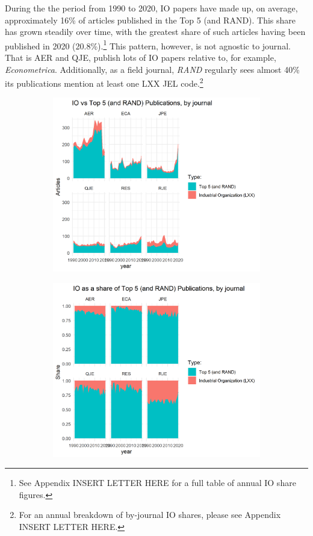\documentclass[11pt, letterpaper, twoside]{article}
\begin{document}
During the the period from 1990 to 2020, IO papers have made up, on average, approximately 16\% of articles published in the Top 5 (and RAND). This share has grown steadily over time, with the greatest share of such articles having been published in 2020 (20.8\%).\footnote{See Appendix INSERT LETTER HERE for a full table of annual IO share figures.} This pattern, however, is not agnostic to journal. That is AER and QJE, publish lots of IO papers relative to, for example, \textit{Econometrica}. Additionally, as a field journal, \textit{RAND} regularly sees almost 40\% its publications mention at least one LXX JEL code.\footnote{For an annual breakdown of by-journal IO shares, please see Appendix INSERT LETTER HERE.}\\

\begin{figure}
    \begin{subfigure}[h]{0.49\textwidth}
        \centering
        \includegraphics[width=\textwidth]{LXX-code-share-area-by-journal.png}
    \end{subfigure}
    \hfill
    \begin{subfigure}[h]{0.49\textwidth}
        \centering
        \includegraphics[width=\textwidth]{LXX-code-share-area-normalized-by-journal.png}

\end{subfigure}
\end{figure}
\end{document}
